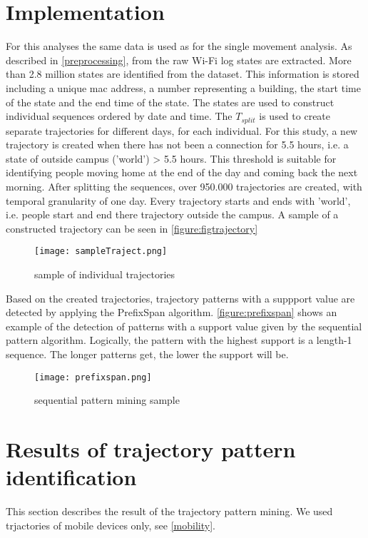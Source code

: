 \section{Implementation}
For this analyses the same data is used as for the single movement analysis. As described in \autoref{preprocessing}, from the raw Wi-Fi log states are extracted. More than 2.8 million states are identified from the dataset. This information is stored including a unique mac address, a number representing a building, the start time of the state and the end time of the state. The states are used to construct individual sequences ordered by date and time. The \textit{$T_{split}$} is used to create separate trajectories for different days, for each individual. For this study, a new trajectory is created when there has not been a connection for 5.5 hours, i.e. a state of outside campus ('world') > 5.5 hours. This threshold is suitable for identifying people moving home at the end of the day and coming back the next morning. After splitting the sequences, over 950.000 trajectories are created, with temporal granularity of one day. Every trajectory starts and ends with 'world', i.e. people start and end there trajectory outside the campus. A sample of a constructed trajectory can be seen in \autoref{figure:figtrajectory}

\begin{figure}[H]
\centering
\texttt{[image: sampleTraject.png]}
\captionsetup{justification=centering}
\caption{sample of individual trajectories}
\label{figure:figtrajectory}
\end{figure}
Based on the created trajectories, trajectory patterns with a suppport value are detected by applying the PrefixSpan algorithm. \autoref{figure:prefixspan} shows an example of the detection of patterns with a support value given by the sequential pattern algorithm. Logically, the pattern with the highest support is a length-1 sequence. The longer patterns get, the lower the support will be.  

\begin{figure}[H]
\centering
\texttt{[image: prefixspan.png]}
\captionsetup{justification=centering}
\caption{sequential pattern mining sample}
\label{figure:prefixspan}
\end{figure}


\section{Results of trajectory pattern identification}
This section describes the result of the trajectory pattern mining. We used trjactories of mobile devices only, see \autoref{mobility}. 

